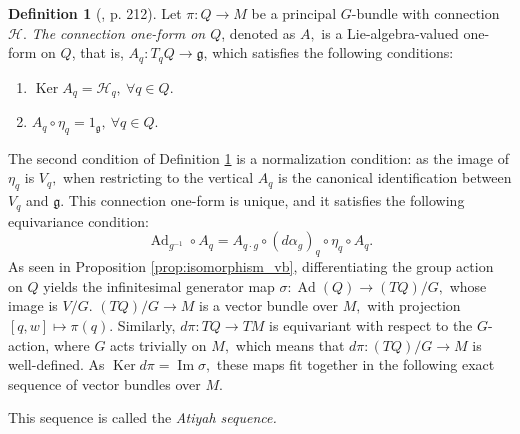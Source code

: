 \documentclass[12pt, letterpaper, reqno]{amsart}
\theoremstyle{definition}
\newtheorem{df}{Definition}
\theoremstyle{plain}
\theoremstyle{remark}
\begin{document}
\begin{df}[\cite{montgomery2002tour}, p. 212]\label{df:connection_one_form}
	Let $ \pi:Q \rightarrow M $ be a principal $ G $-bundle with connection $ \mathcal{H} $. \textit{The connection one-form on $ Q $}, denoted as $ A, $ is a Lie-algebra-valued one-form on $ Q $, that is, $ A_q: T_qQ \rightarrow \mathfrak{g} $,  which satisfies the following conditions:

	\begin{enumerate}
		\item $ \operatorname{Ker} A_q = \mathcal{H}_q, \ \forall q\in Q. $ 
		\item $ A_q \circ \eta_q = 1_{ \mathfrak{g}}, \ \forall q\in Q. $ 
	\end{enumerate}
\end{df}
The second condition of Definition \ref{df:connection_one_form} is a normalization condition: as the image of $ \eta_q $ is $ V_q, $ when restricting to the vertical $ A_q $ is the canonical identification between $ V_q $ and $ \mathfrak{g} $. This connection one-form is unique, and it satisfies the following equivariance condition:
$$ \operatorname{Ad}_{g^{-1}}\circ A_q = A_{q\cdot g}\circ (d\alpha_g)_q\circ \eta_q\circ A_q. $$ 
As seen in Proposition \ref{prop:isomorphism_vb}, differentiating the group action on $ Q $ yields the infinitesimal generator map $ \sigma: \operatorname{Ad}(Q) \rightarrow (TQ)/G,  $ whose image is $ V/G. $ $ (TQ)/G \rightarrow M $ is a vector bundle over $ M, $ with projection $ [q,w] \mapsto \pi(q). $ Similarly, $ d\pi: TQ \rightarrow TM $ is equivariant with respect to the $ G $-action, where $ G $ acts trivially on $ M, $ which means that $ d\pi: (TQ)/G \rightarrow M $ is well-defined. As $ \operatorname{Ker} d\pi = \operatorname{Im} \sigma,   $ these maps fit together in the following exact sequence of vector bundles over $ M $. 
\begin{center}
\end{center}
This sequence is called the \textit{Atiyah sequence.}  
\end{document}
